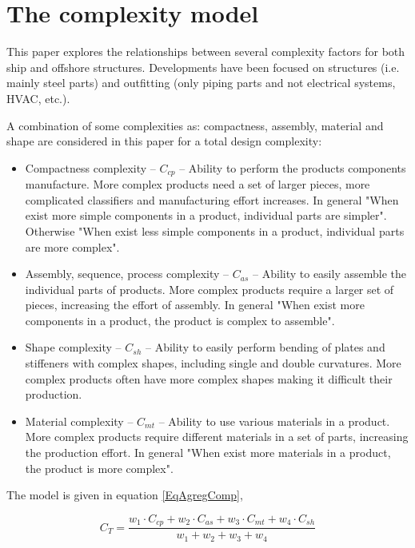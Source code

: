 \section{The complexity model}
This paper explores the relationships between several complexity factors for both ship and offshore structures. Developments have been focused on structures (i.e. mainly steel parts) and outfitting (only piping parts and not electrical systems, HVAC, etc.).


A combination of some complexities as: compactness, assembly, material and shape are considered in this paper for a total design complexity:
\begin{itemize}
\item Compactness complexity -- $C_{cp}$ -- Ability to perform the products components manufacture. More complex products need a set of larger pieces, more complicated classifiers and manufacturing effort increases. In general "When exist more simple components in a product, individual parts are simpler". Otherwise "When exist less simple components in a product, individual parts are more complex".
\item Assembly, sequence, process complexity -- $C_{as}$ -- Ability to easily assemble the individual parts of products. More complex products require a larger set of pieces, increasing the effort of assembly. In general "When exist more components in a product, the product is complex to assemble". 
\item Shape complexity -- $C_{sh}$ -- Ability to easily perform bending of plates and stiffeners with complex shapes, including single and double curvatures. More complex products often have more complex shapes making it difficult their production.
\item Material complexity -- $C_{mt}$ -- Ability to use various materials in a product. More complex products require different materials in a set of parts, increasing the production effort. In general "When exist more materials in a product, the product is more complex".
\end{itemize}

The model is given in equation \ref{EqAgregComp}, %

\begin{equation}
\label{EqAgregComp}
C_T = \frac{w_1 \cdot C_{cp} + w_2 \cdot C_{as} + w_3 \cdot C_{mt} + w_4 \cdot C_{sh} }{w_1 + w_2 + w_3 + w_4}
\end{equation}

